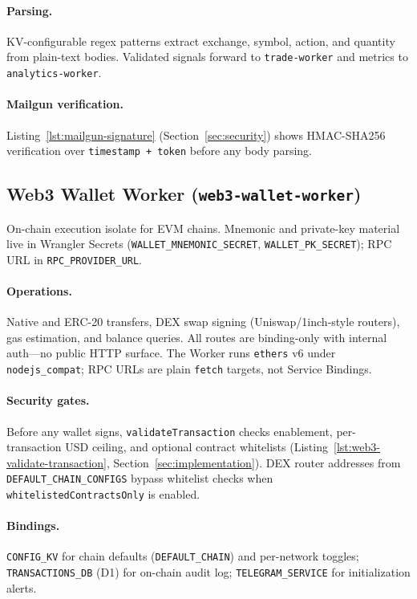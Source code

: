 \paragraph{Parsing.} KV-configurable regex patterns extract exchange, symbol, action, and quantity from plain-text bodies. Validated signals forward to \texttt{trade-worker} and metrics to \texttt{analytics-worker}.

\paragraph{Mailgun verification.} Listing~\ref{lst:mailgun-signature} (Section~\ref{sec:security}) shows HMAC-SHA256 verification over \texttt{timestamp + token} before any body parsing.

\subsection{Web3 Wallet Worker (\texttt{web3-wallet-worker})}

On-chain execution isolate for EVM chains. Mnemonic and private-key material live in Wrangler Secrets (\texttt{WALLET\_MNEMONIC\_SECRET}, \texttt{WALLET\_PK\_SECRET}); RPC URL in \texttt{RPC\_PROVIDER\_URL}.

\paragraph{Operations.} Native and ERC-20 transfers, DEX swap signing (Uniswap/1inch-style routers), gas estimation, and balance queries. All routes are binding-only with internal auth---no public HTTP surface. The Worker runs \texttt{ethers} v6 under \texttt{nodejs\_compat}; RPC URLs are plain \texttt{fetch} targets, not Service Bindings.

\paragraph{Security gates.} Before any wallet signs, \texttt{validateTransaction} checks enablement, per-transaction USD ceiling, and optional contract whitelists (Listing~\ref{lst:web3-validate-transaction}, Section~\ref{sec:implementation}). DEX router addresses from \texttt{DEFAULT\_CHAIN\_CONFIGS} bypass whitelist checks when \texttt{whitelistedContractsOnly} is enabled.

\paragraph{Bindings.} \texttt{CONFIG\_KV} for chain defaults (\texttt{DEFAULT\_CHAIN}) and per-network toggles; \texttt{TRANSACTIONS\_DB} (D1) for on-chain audit log; \texttt{TELEGRAM\_SERVICE} for initialization alerts.

